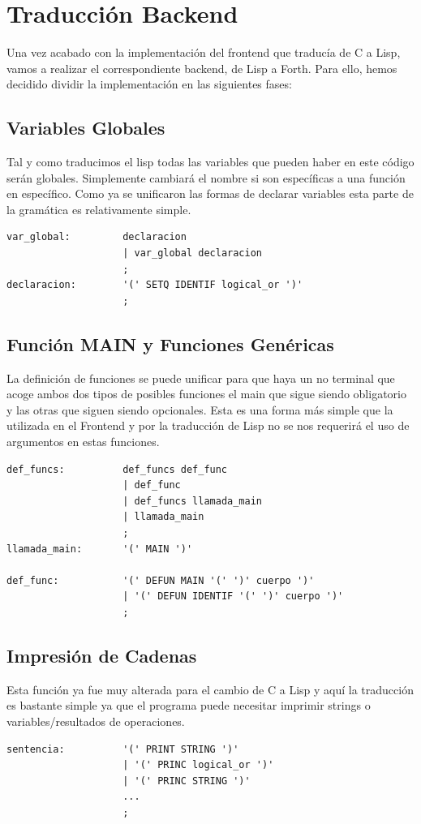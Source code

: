 \documentclass[12pt,a4paper]{article}
\begin{document}
\section{Traducción Backend}
\noindent Una vez acabado con la implementación del frontend que traducía de C a Lisp, vamos a 
realizar el correspondiente backend, de Lisp a Forth. Para ello, hemos decidido dividir la 
implementación en las siguientes fases:
\subsection{Variables Globales}
\noindent Tal y como traducimos el lisp todas las variables que pueden haber en este código serán 
globales. Simplemente cambiará el nombre si son específicas a una función en específico. Como ya 
se unificaron las formas de declarar variables esta parte de la gramática es relativamente simple.
\begin{lstlisting}
var_global:         declaracion                                                        
                    | var_global declaracion
                    ;                               
declaracion:        '(' SETQ IDENTIF logical_or ')'
                    ; 
\end{lstlisting}
\subsection{Función MAIN y Funciones Genéricas}
\noindent La definición de funciones se puede unificar para que haya un no terminal que acoge ambos 
dos tipos de posibles funciones el main que sigue siendo obligatorio y las otras que siguen siendo 
opcionales. Esta es una forma más simple que la utilizada en el Frontend y por la traducción de Lisp 
no se nos requerirá el uso de argumentos en estas funciones.
\begin{lstlisting}
def_funcs:          def_funcs def_func                
                    | def_func                                                         
                    | def_funcs llamada_main       
                    | llamada_main                                                      
                    ;
llamada_main:       '(' MAIN ')'

def_func:           '(' DEFUN MAIN '(' ')' cuerpo ')'
                    | '(' DEFUN IDENTIF '(' ')' cuerpo ')'
                    ;  
\end{lstlisting}
\subsection{Impresión de Cadenas}
\noindent Esta función ya fue muy alterada para el cambio de C a Lisp y aquí la traducción es 
bastante simple ya que el programa puede necesitar imprimir strings o variables/resultados de 
operaciones. 
\begin{lstlisting}
sentencia:          '(' PRINT STRING ')'            
                    | '(' PRINC logical_or ')'          
                    | '(' PRINC STRING ')' 
                    ...
                    ;
\end{lstlisting}
\end{document}
